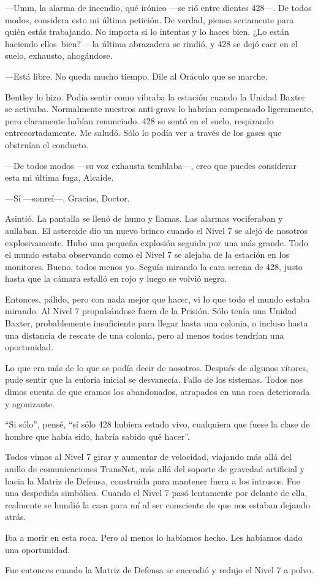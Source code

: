 ---Umm, la alarma de incendio, qué irónico ---se rió entre dientes
428---. De todos modos, considera esto mi última petición. De verdad,
piensa seriamente para quién estás trabajando. No importa si lo intentas
y lo haces bien. ¿Lo están haciendo ellos~bien? ---la última abrazadera
se rindió, y 428 se dejó caer en el suelo, exhausto, ahogándose.

---Está libre. No queda mucho tiempo. Dile al Oráculo que se marche.

Bentley lo hizo. Podía sentir como vibraba la estación cuando la Unidad
Baxter se activaba. Normalmente nuestros anti-gravs lo habrían
compensado ligeramente, pero claramente habían renunciado. 428 se sentó
en el suelo, respirando entrecortadamente. Me saludó. Sólo lo podía ver
a través de los gases que obstruían el conducto.

---De todos modos ---su voz exhausta temblaba---, creo que puedes
considerar esta mi última fuga, Alcaide.

---Sí ---sonreí---. Gracias, Doctor.

Asintió. La pantalla se llenó de humo y llamas. Las alarmas vociferaban
y aullaban. El asteroide dio un nuevo brinco cuando el Nivel 7 se alejó
de nosotros explosivamente. Hubo una pequeña explosión seguida por una
más grande. Todo el mundo estaba observando como el Nivel 7 se alejaba
de la estación en los monitores. Bueno, todos menos yo. Seguía mirando
la cara serena de 428, justo hasta que la cámara estalló en rojo y luego
se volvió negro.

Entonces, pálido, pero con nada mejor que hacer, vi lo que todo el mundo
estaba mirando. Al Nivel 7 propulsándose fuera de la Prisión. Sólo tenía
una Unidad Baxter, probablemente insuficiente para llegar hasta una
colonia, o incluso hasta una distancia de rescate de una colonia, pero
al menos todos tendrían una oportunidad.

Lo que era más de lo que se podía decir de nosotros. Después de algunos
vítores, pude sentir que la euforia inicial se desvanecía. Fallo de los
sistemas. Todos nos dimos cuenta de que eramos los abandonados,
atrapados en una roca deteriorada y agonizante.

``Si sólo'', pensé, ``sí sólo 428 hubiera estado vivo, cualquiera que
fuese la clase de hombre que había sido, habría sabido qué hacer''.

Todos vimos al Nivel 7 girar y aumentar de velocidad, viajando más allá
del anillo de comunicaciones TransNet, más allá del soporte de gravedad
artificial y hacia la Matriz de Defensa, construida para mantener fuera
a los intrusos. Fue una despedida simbólica. Cuando el Nivel 7 pasó
lentamente por delante de ella, realmente se hundió la casa para mí al
ser consciente de que nos estaban dejando atrás.

Iba a morir en esta roca. Pero al menos lo habíamos hecho. Les habíamos
dado una oportunidad.

Fue entonces cuando la Matriz de Defensa se encendió y redujo el Nivel 7
a polvo.

